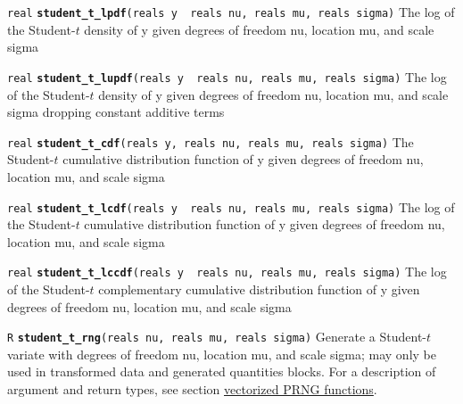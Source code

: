 \documentclass[
  10pt,
]{book}
\begin{document}
\texttt{real} \textbf{\texttt{student\_t\_lpdf}}\texttt{(reals\ y\ \textbar{}\ reals\ nu,\ reals\ mu,\ reals\ sigma)}\newline
The log of the Student-\(t\) density of y given degrees of freedom nu,
location mu, and scale sigma


\texttt{real} \textbf{\texttt{student\_t\_lupdf}}\texttt{(reals\ y\ \textbar{}\ reals\ nu,\ reals\ mu,\ reals\ sigma)}\newline
The log of the Student-\(t\) density of y given degrees of freedom nu,
location mu, and scale sigma dropping constant additive terms


\texttt{real} \textbf{\texttt{student\_t\_cdf}}\texttt{(reals\ y,\ reals\ nu,\ reals\ mu,\ reals\ sigma)}\newline
The Student-\(t\) cumulative distribution function of y given degrees of
freedom nu, location mu, and scale sigma


\texttt{real} \textbf{\texttt{student\_t\_lcdf}}\texttt{(reals\ y\ \textbar{}\ reals\ nu,\ reals\ mu,\ reals\ sigma)}\newline
The log of the Student-\(t\) cumulative distribution function of y given
degrees of freedom nu, location mu, and scale sigma


\texttt{real} \textbf{\texttt{student\_t\_lccdf}}\texttt{(reals\ y\ \textbar{}\ reals\ nu,\ reals\ mu,\ reals\ sigma)}\newline
The log of the Student-\(t\) complementary cumulative distribution
function of y given degrees of freedom nu, location mu, and scale
sigma


\texttt{R} \textbf{\texttt{student\_t\_rng}}\texttt{(reals\ nu,\ reals\ mu,\ reals\ sigma)}\newline
Generate a Student-\(t\) variate with degrees of freedom nu, location
mu, and scale sigma; may only be used in transformed data and generated
quantities blocks. For a description of argument and return types, see section
\protect\hyperlink{prng-vectorization}{vectorized PRNG functions}.
\end{document}
